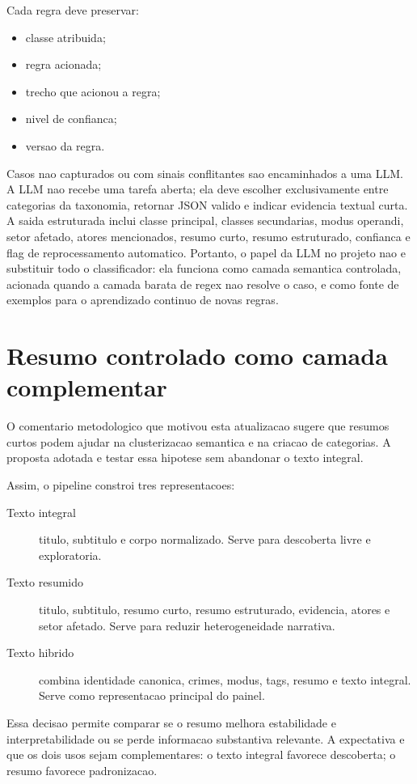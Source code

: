\documentclass[12pt]{article}
\begin{document}
Cada regra deve preservar:

\begin{itemize}
    \item classe atribuida;
    \item regra acionada;
    \item trecho que acionou a regra;
    \item nivel de confianca;
    \item versao da regra.
\end{itemize}

Casos nao capturados ou com sinais conflitantes sao encaminhados a uma LLM. A LLM nao recebe uma tarefa aberta; ela deve escolher exclusivamente entre categorias da taxonomia, retornar JSON valido e indicar evidencia textual curta. A saida estruturada inclui classe principal, classes secundarias, modus operandi, setor afetado, atores mencionados, resumo curto, resumo estruturado, confianca e flag de reprocessamento automatico. Portanto, o papel da LLM no projeto nao e substituir todo o classificador: ela funciona como camada semantica controlada, acionada quando a camada barata de regex nao resolve o caso, e como fonte de exemplos para o aprendizado continuo de novas regras.

\section{Resumo controlado como camada complementar}

O comentario metodologico que motivou esta atualizacao sugere que resumos curtos podem ajudar na clusterizacao semantica e na criacao de categorias. A proposta adotada e testar essa hipotese sem abandonar o texto integral.

Assim, o pipeline constroi tres representacoes:

\begin{description}
    \item[Texto integral] titulo, subtitulo e corpo normalizado. Serve para descoberta livre e exploratoria.
    \item[Texto resumido] titulo, subtitulo, resumo curto, resumo estruturado, evidencia, atores e setor afetado. Serve para reduzir heterogeneidade narrativa.
    \item[Texto hibrido] combina identidade canonica, crimes, modus, tags, resumo e texto integral. Serve como representacao principal do painel.
\end{description}

Essa decisao permite comparar se o resumo melhora estabilidade e interpretabilidade ou se perde informacao substantiva relevante. A expectativa e que os dois usos sejam complementares: o texto integral favorece descoberta; o resumo favorece padronizacao.
\end{document}
